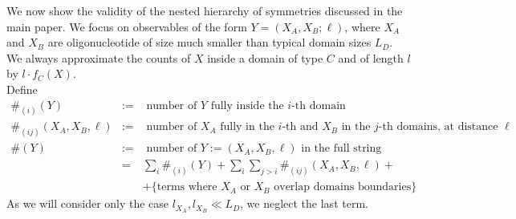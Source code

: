 \documentclass[fleqn,10pt]{wlscirep}
\begin{document}
We now show the validity of the nested hierarchy of symmetries discussed in the main paper. We focus on observables of the form $Y=(X_A,X_B;\ell)$, where $X_A$ and $X_B$ are oligonucleotide of size much smaller than typical domain sizes $L_{D}$.
We always approximate the counts of $X $ inside a domain of type $C$ and of length $l$ by $l \cdot f_C(X)$.
\\

Define
\begin{eqnarray}
\#_{(i)}(Y)&:=&  \textrm{  number of $Y$ fully inside the $i$-th domain}\nonumber \\
%
\#_{(ij)}(X_A,X_B,\ell)&:=& \textrm{  number of $X_A$ fully in the $i$-th and $X_B$ in the $j$-th domains, at distance $\ell$} \nonumber \\
\#(Y)&:=& \textrm{  number of $Y:=(X_A,X_B,\ell)$ in the full string} \label{countsY}\nonumber\\
&=& \sum_{i} \#_{(i)}(Y)+ \sum_{i}\sum_{j>i}{\#_{(ij)}(X_A,X_B,\ell)} + \nonumber \\ &\quad&+\{ \textrm{terms where $X_A$ or $X_B$ overlap domains boundaries}\}\nonumber
\end{eqnarray}
\vspace{0.4cm}
%
As we will consider only the case $l_{X_A},l_{X_B}  \ll L_D$,  we neglect the last term.
\end{document}
